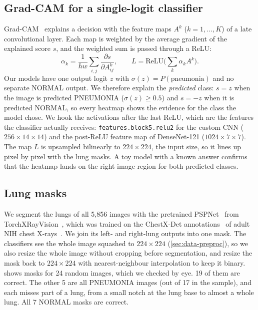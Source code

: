 \subsection{Grad-CAM for a single-logit classifier}
\label{sec:gradcam-method}
Grad-CAM~\cite{selvaraju2017gradcam} explains a decision with the feature maps $A^k$ ($k=1,\dots,K$) of a late convolutional layer.
Each map is weighted by the average gradient of the explained score $s$, and the weighted sum is passed through a ReLU:
\begin{equation}
  \alpha_k = \frac{1}{hw}\sum_{i,j}\frac{\partial s}{\partial A^k_{ij}}, \qquad
  L = \mathrm{ReLU}\Big(\sum_k \alpha_k A^k\Big).
  \label{eq:gradcam}
\end{equation}
Our models have one output logit $z$ with $\sigma(z)=P(\text{pneumonia})$ and no separate NORMAL output.
We therefore explain the \emph{predicted} class: $s=z$ when the image is predicted PNEUMONIA ($\sigma(z)\ge0.5$) and $s=-z$ when it is predicted NORMAL,
so every heatmap shows the evidence for the class the model chose.
We hook the activations after the last ReLU, which are the features the classifier actually receives:
\texttt{features.block5.relu2} for the custom CNN ($256\times14\times14$) and the post-ReLU feature map of DenseNet-121 ($1024\times7\times7$).
The map $L$ is upsampled bilinearly to $224\times224$, the input size, so it lines up pixel by pixel with the lung masks.
A toy model with a known answer confirms that the heatmap lands on the right image region for both predicted classes.

\subsection{Lung masks}
\label{sec:gradcam-masks}
We segment the lungs of all 5,856 images with the pretrained PSPNet~\cite{zhao2017pspnet} from TorchXRayVision~\cite{cohen2022torchxrayvision},
which was trained on the ChestX-Det annotations~\cite{lian2021chestxdet} of adult NIH chest X-rays~\cite{wang2017chestxray8}.
We join its left- and right-lung outputs into one mask.
The classifiers see the whole image squashed to $224\times224$ (\cref{sec:data-preproc}), so we also resize the whole image without cropping before segmentation,
and resize the mask back to $224\times224$ with nearest-neighbour interpolation to keep it binary.
 shows masks for 24 random images, which we checked by eye.
19 of them are correct. The other 5 are all PNEUMONIA images (out of 17 in the sample), and each misses part of a lung, from a small notch at the lung base to almost a whole lung.
All 7 NORMAL masks are correct.

